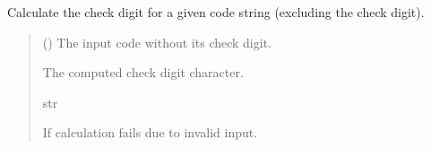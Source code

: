 \documentclass[letterpaper,10pt,english]{sphinxmanual}
\begin{document}
\begin{fulllineitems}
\begin{fulllineitems}
\begin{quote}
\begin{description}
\end{description}\end{quote}

\end{fulllineitems}


\begin{fulllineitems}
\label{\detokenize{apache_commons_validator_python.routines.checkdigit:apache_commons_validator_python.routines.checkdigit.checkdigit.CheckDigit.calculate}}
\pysigstartsignatures
{}
\pysigstopsignatures
\sphinxAtStartPar
Calculate the check digit for a given code string (excluding the check digit).
\begin{quote}\begin{description}
\sphinxAtStartPar
{} () \textendash{} The input code without its check digit.

\sphinxAtStartPar
The computed check digit character.

\sphinxAtStartPar
str

\sphinxAtStartPar
{\hyperref[\detokenize{apache_commons_validator_python.routines.checkdigit:apache_commons_validator_python.routines.checkdigit.checkdigit_exception.CheckDigitException}]{}} \textendash{} If calculation fails due to invalid input.

\end{description}\end{quote}

\end{fulllineitems}



\end{fulllineitems}
\end{document}
